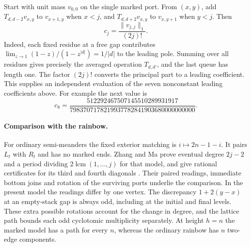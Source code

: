 Start with unit mass \(v_{0,0}\) on the single marked port. From
\((x,y)\), add \(T_{d,d-2}v_{x,y}\) to \(v_{x+1,y}\) when \(x<j\),
and \(T_{d,d+2}v_{x,y}\) to \(v_{x,y+1}\) when \(y<j\). Then
\[
                       c_j=\frac{\|v_{j,j}\|_1}{(2j)!}.
\]
Indeed, each fixed residue at a free gap contributes
\(\lim_{z\to1}(1-z)/(1-z^{|d|})=1/|d|\) to the leading pole.
Summing over all residues gives precisely the averaged operation
\(T_{d,d'}\), and the last queue has length one. The factor \((2j)!\)
converts the principal part to a leading coefficient. This supplies
an independent evaluation of the seven nonconstant leading
coefficients above. For example the next value is
\[
c_8=\frac{512292467507145510289931917}
          {7983707178219937782841903680000000000}.
\]

\paragraph{Comparison with the rainbow.}
For ordinary semi-meanders the fixed exterior matching is
\(i\mapsto2n-1-i\). It pairs \(L_t\) with \(R_t\) and has no marked
ends. Zhang and Ma prove eventual degree \(2j-2\) and a period dividing
\(2\operatorname{lcm}(1,\ldots,j)\) for that model, and give rational
certificates for its third and fourth diagonals \cite{zhangma2026}.
Their paired readings, immediate bottom joins and rotation of the
surviving ports underlie the comparison. In the present model the
readings differ by one vertex. The discrepancy \(1+2(y-x)\) at an
empty-stack gap is always odd, including at the initial and final
levels. These extra possible rotations account for the change in
degree, and the lattice path bounds each odd cyclotomic multiplicity
separately. At height \(h=n\) the marked
model has a path for every \(n\), whereas the ordinary rainbow has
\(n\) two-edge components.
